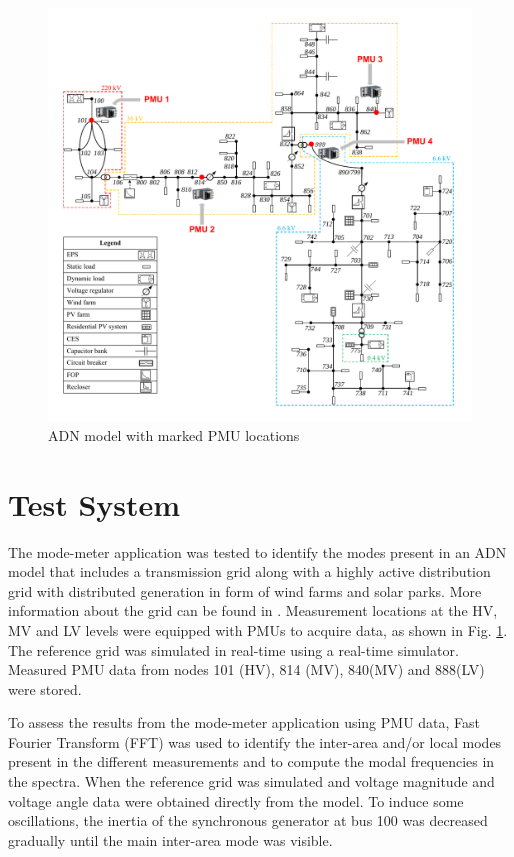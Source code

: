 \documentclass[conference]{IEEEtran}
\begin{document}
\begin{figure}[!h]
\centering
\includegraphics[width=5.5in]{grid}
\caption{ADN model with marked PMU locations}
\label{fig:grid}
\end{figure} 

\section{Test System}
The mode-meter application was tested to identify the modes present in an ADN model that includes a transmission grid along with a highly active distribution grid with distributed generation in form of wind farms and solar parks. More information about the grid can be found in \cite{refgrid}. Measurement locations at the HV, MV and LV levels were equipped with PMUs to acquire data, as shown in Fig. \ref{fig:grid}.  The reference grid was simulated in real-time using a real-time simulator. Measured PMU data from nodes 101 (HV), 814 (MV), 840(MV) and 888(LV)  were stored. 


To assess the results from the mode-meter application using PMU data, Fast Fourier Transform (FFT) was used to identify the inter-area and/or local modes present in the different measurements and to compute the modal frequencies in the spectra. When the reference grid was simulated and voltage magnitude and voltage angle data were obtained directly from the model. To induce some oscillations, the inertia of the synchronous generator at bus 100 was decreased gradually until the main inter-area mode was visible. 
\end{document}
